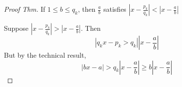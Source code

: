     \begin{proof} [Proof Thm]
        If $1\le b \le q_k$, then $\frac{a}{b}$ satisfies $|x-\frac{p_k}{q_k}| < |x-\frac{a}{b}|$

        Suppose $|x-\frac{p_k}{q_k}| > |x-\frac{a}{b}|$. Then 
        \[
            |q_kx-p_k > q_k| |x-\frac{a}{b}|
        \]
        But by the technical result, 
        \[
            |bx-a| > q_k|x-\frac{a}{b}| \ge b|x-\frac{a}{b}|
        \]
    \end{proof}